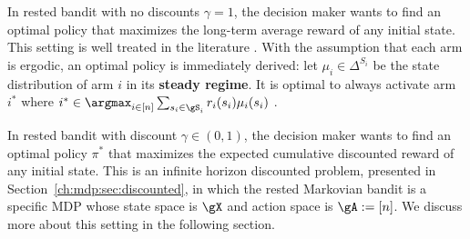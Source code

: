 In rested bandit with no discounts $\gamma=1$, the decision maker wants to find an optimal policy that maximizes the long-term average reward of any initial state.
This setting is well treated in the literature \cite{anantharam1987asymptotically, tekin2010online}.
With the assumption that each arm is ergodic, an optimal policy is immediately derived: let $\mu_i\in\Delta^{S_i}$ be the state distribution of arm $i$ in its \textbf{steady regime}.
It is optimal to always activate arm $i^*$ where $i^*\in\argmax_{i\in[n]}\sum_{s_i\in\gS_i}r_i(s_i)\mu_i(s_i)$ \cite{tekin2010online}.


In rested bandit with discount $\gamma\in(0,1)$, the decision maker wants to find an optimal policy $\pi^*$ that maximizes the expected cumulative discounted reward of any initial state.
This is an infinite horizon discounted problem, presented in Section~\ref{ch:mdp:sec:discounted}, in which the rested Markovian bandit is a specific MDP whose state space is $\gX$ and action space is $\gA:=[n]$.
We discuss more about this setting in the following section.

